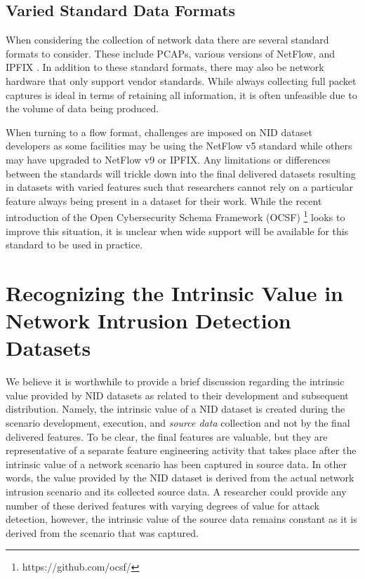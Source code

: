 \documentclass[conference]{IEEEtran}
\begin{document}
\subsection{Varied Standard Data Formats}\label{subsec:nostandard}
When considering the collection of network data there are several standard formats to consider.
These include PCAPs, various versions of NetFlow, and IPFIX \cite{claise2008specification}.
In addition to these standard formats, there may also be network hardware that only support vendor standards.
While always collecting full packet captures is ideal in terms of retaining all information, it is often unfeasible due to the volume of data being produced.

When turning to a flow format, challenges are imposed on NID dataset developers as some facilities may be using the NetFlow v5 standard while others may have upgraded to NetFlow v9 or IPFIX.
Any limitations or differences between the standards will trickle down into the final delivered datasets resulting in datasets with varied features such that researchers cannot rely on a particular feature always being present in a dataset for their work.
While the recent introduction of the Open Cybersecurity Schema Framework (OCSF) \footnote{https://github.com/ocsf/} looks to improve this situation, it is unclear when wide support will be available for this  standard to be used in practice.

\section{Recognizing the Intrinsic Value in Network Intrusion Detection Datasets}\label{sec:intrinsic_value}
We believe it is worthwhile to provide a brief discussion regarding the intrinsic value provided by NID datasets as related to their development and subsequent distribution.
Namely, the intrinsic value of a NID dataset is created during the scenario development, execution, and \textit{source data} collection and not by the final delivered features.
To be clear, the final features are valuable, but they are representative of a separate feature engineering activity that takes place after the intrinsic value of a network scenario has been captured in source data.
In other words, the value provided by the NID dataset is derived from the actual network intrusion scenario and its collected source data. 
A researcher could provide any number of these derived features with varying degrees of value for attack detection, however, the intrinsic value of the source data remains constant as it is derived from the scenario that was captured.
\end{document}
